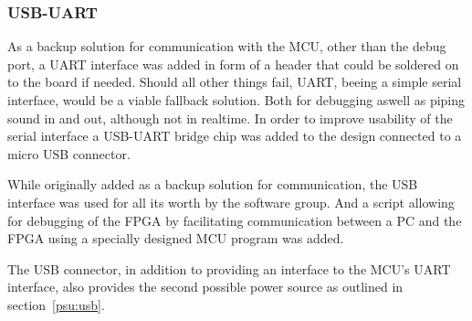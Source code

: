 
\subsubsection{USB-UART}

As a backup solution for communication with the MCU, other than the debug
port, a UART interface was added in form of a header that could be soldered
on to the board if needed. Should all other things fail, UART, beeing a simple
serial interface, would be a viable fallback solution. Both for debugging aswell
as piping sound in and out, although not in realtime. In order to improve 
usability of the serial interface a USB-UART bridge chip was added to the design
connected to a micro USB connector. 

While originally added as a backup solution for communication, the USB interface
was used for all its worth by the software group. And a script allowing for debugging
of the FPGA by facilitating communication between a PC and the FPGA using a specially
designed MCU program was added. 

The USB connector, in addition to providing an interface to the MCU's UART
interface, also provides the second possible power source as outlined in 
section~\ref{psu:usb}.